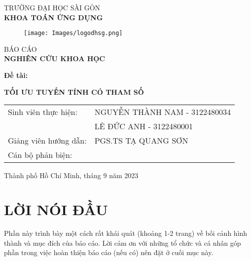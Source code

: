 \documentclass{article} %
\begin{document}
\begin{center}
\vspace{-15pt} TRƯỜNG ĐẠI HỌC SÀI GÒN\\
\textbf{\fontsize{16pt}{0pt}\selectfont KHOA TOÁN ỨNG DỤNG}
\vspace{0.5cm}
\begin{figure}[H]
    \centering
    \texttt{[image: Images/logodhsg.png]}
\end{figure}
\vspace{1.5cm}
\fontsize{24pt}{0pt}\selectfont BÁO CÁO\\
\vspace{12pt}
\textbf{\fontsize{32pt}{0pt}\selectfont NGHIÊN CỨU KHOA HỌC}
\vspace{1.5cm}
\end{center}
\hspace{20pt}\textbf{\fontsize{14pt}{0pt}\selectfont Đề tài:}
\begin{center}
\textbf{\fontsize{20pt}{0pt}\selectfont TỐI ƯU TUYẾN TÍNH CÓ THAM SỐ} 
\vspace{1cm}
\begin{table}[H]
    \centering
    \begin{tabular}{l l}
\fontsize{14pt}{0pt}\selectfont Sinh viên thực hiện:     & \fontsize{14pt}{0pt}\selectfont NGUYỄN THÀNH NAM - 3122480034 \vspace{6pt}\\     
  & \fontsize{14pt}{0pt}\selectfont LÊ ĐỨC ANH - 3122480001 \vspace{6pt}\\
\fontsize{14pt}{0pt}\selectfont Giảng viên hướng dẫn: & \fontsize{14pt}{0pt}\selectfont PGS.TS TẠ QUANG SƠN \vspace{6pt}\\
Cán bộ phản biện: & 
\end{tabular}
\end{table}
\vspace{0.5cm}
\fontsize{14pt}{0pt}\selectfont Thành phố Hồ Chí Minh, tháng 9 năm 2023
\end{center}
\cleardoublepage
\section*{LỜI NÓI ĐẦU}
\thispagestyle{empty}
Phần này trình bày một cách rất khái quát (khoảng 1-2 trang) về bối cảnh hình thành và mục đích của báo cáo. Lời cảm ơn với những tổ chức và cá nhân góp phần trong việc hoàn thiện báo cáo (nếu có) nên đặt ở cuối mục này.
\cleardoublepage
\end{document}
